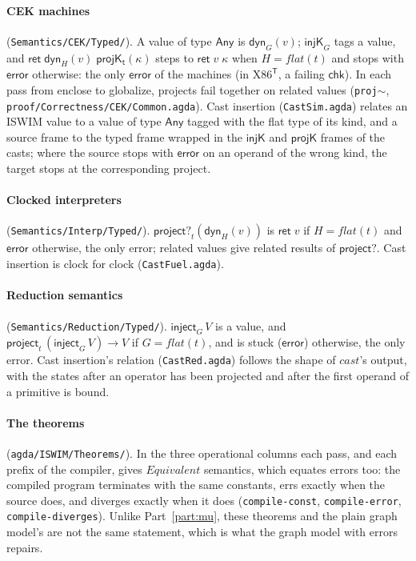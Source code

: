\documentclass[10pt]{article}
\theoremstyle{acmplain}
\newcommand{\key}[1]{\mathsf{#1}}
\newcommand{\pass}[1]{\mathit{#1}}
\newcommand{\rt}[2]{\key{ret}\;#1\;#2}
\newcommand{\error}{\key{error}}
\newcommand{\Equiv}{\mathit{Equivalent}}
\newcommand{\Kf}[2]{\key{#1}(#2)}
\newcommand{\Ret}{\key{ret}\;}
\newcommand{\Tl}[1]{\textrm{#1}^{\mathsf{T}}}  %
\newcommand{\TAny}{\key{Any}}
\newcommand{\Tflatof}[1]{\mathit{flat}(#1)}    %
\newcommand{\Tinject}[1]{\key{inject}_{#1}\,}
\newcommand{\Tproject}[1]{\key{project}_{#1}\,}
\newcommand{\TdynV}[2]{\key{dyn}_{#1}(#2)}                %
\begin{document}
\paragraph{CEK machines} (\texttt{Semantics/CEK/Typed/}). A value of type
$\TAny$ is $\TdynV{G}{v}$; $\key{injK}_G$ tags a value, and
$\rt{\TdynV{H}{v}}{\Kf{projK_t}{\kappa}}$ steps to $\rt{v}{\kappa}$ when $H =
\Tflatof{t}$ and stops with $\error$ otherwise: the only $\error$ of the
machines (in $\Tl{X86}$, a failing $\key{chk}$). In each pass from enclose
to globalize, projects fail together on related values (\texttt{proj$\sim$},
\texttt{proof/Correctness/CEK/Common.agda}). Cast insertion
(\texttt{CastSim.agda}) relates an ISWIM value to a value of type $\TAny$
tagged with the flat type of its kind, and a source frame to the typed
frame wrapped in the $\key{injK}$ and $\key{projK}$ frames of the casts;
where the source stops with $\error$ on an operand of the wrong kind, the
target stops at the corresponding project.

\paragraph{Clocked interpreters} (\texttt{Semantics/Interp/Typed/}).
$\key{project?}_t(\TdynV{H}{v})$ is $\Ret v$ if $H = \Tflatof{t}$ and
$\error$ otherwise, the only error; related values give related results of
$\key{project?}$. Cast insertion is clock for clock (\texttt{CastFuel.agda}).

\paragraph{Reduction semantics} (\texttt{Semantics/Reduction/Typed/}).
$\Tinject{G} V$ is a value, and
$\Tproject{t} (\Tinject{G} V) \to V$ if $G = \Tflatof{t}$, and is stuck
($\error$) otherwise, the only error. Cast insertion's relation
(\texttt{CastRed.agda}) follows the shape of $\pass{cast}$'s output, with the
states after an operator has been projected and after the first operand of
a primitive is bound.

\paragraph{The theorems} (\texttt{agda/ISWIM/Theorems/}). In the three operational
columns each pass, and each prefix of the compiler, gives $\Equiv$
semantics, which equates errors too: the compiled program terminates with
the same constants, errs exactly when the source does, and diverges exactly
when it does (\texttt{compile-const}, \texttt{compile-error},
\texttt{compile-diverges}). Unlike Part~\ref{part:mu}, these theorems and the
plain graph model's are not the same statement, which is what the graph
model with errors repairs.
\end{document}
